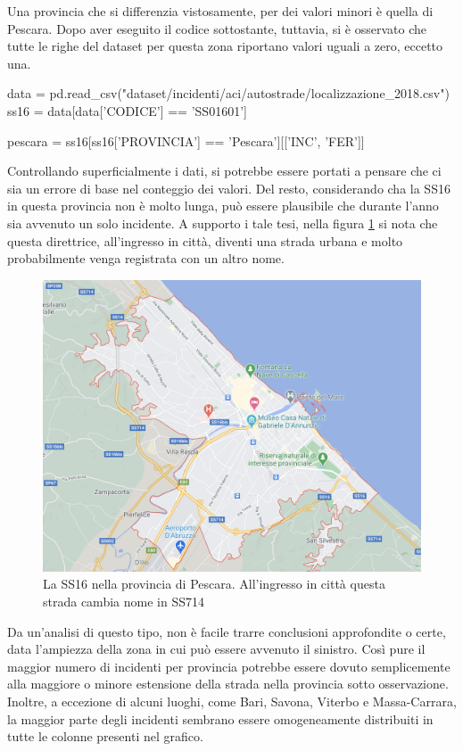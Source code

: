\documentclass[a4paper,12pt]{report}
\begin{document}
Una provincia che si differenzia vistosamente, per dei valori minori è quella di Pescara. 
Dopo aver eseguito il codice sottostante, tuttavia, si è osservato che tutte le righe 
del dataset per questa zona riportano valori uguali a zero, eccetto una. 

\begin{code}
data = pd.read_csv("dataset/incidenti/aci/autostrade/localizzazione_2018.csv")
ss16 = data[data['CODICE'] == 'SS01601']

pescara = ss16[ss16['PROVINCIA'] == 'Pescara'][['INC', 'FER']]
\end{code}

Controllando superficialmente i dati, si potrebbe essere portati a pensare 
che ci sia un errore di base nel conteggio dei valori. 
Del resto, considerando cha la SS16 in questa provincia non è molto lunga, 
può essere plausibile che durante l'anno sia avvenuto un solo incidente. 
A supporto i tale tesi, nella figura \ref{fig:ss16-pescara} si nota che questa direttrice, 
all'ingresso in città, diventi una strada urbana e molto probabilmente venga 
registrata con un altro nome.

\begin{figure}
    \hfill\includegraphics[width=0.7\linewidth]{img/pescara_ss16.png}\hspace*{\fill}
    \caption{La SS16 nella provincia di Pescara. All'ingresso in città questa strada cambia nome in SS714}
    \label{fig:ss16-pescara}
\end{figure}

Da un'analisi di questo tipo, non è facile trarre conclusioni approfondite 
o certe, data l'ampiezza della zona in cui può essere avvenuto il sinistro. 
Così pure il maggior numero di incidenti per provincia potrebbe essere dovuto 
semplicemente alla maggiore o minore estensione della strada nella 
provincia sotto osservazione. 
Inoltre, a eccezione di alcuni luoghi, come Bari, Savona, Viterbo e Massa-Carrara, 
la maggior parte degli incidenti sembrano essere omogeneamente distribuiti 
in tutte le colonne presenti nel grafico. 
\end{document}
